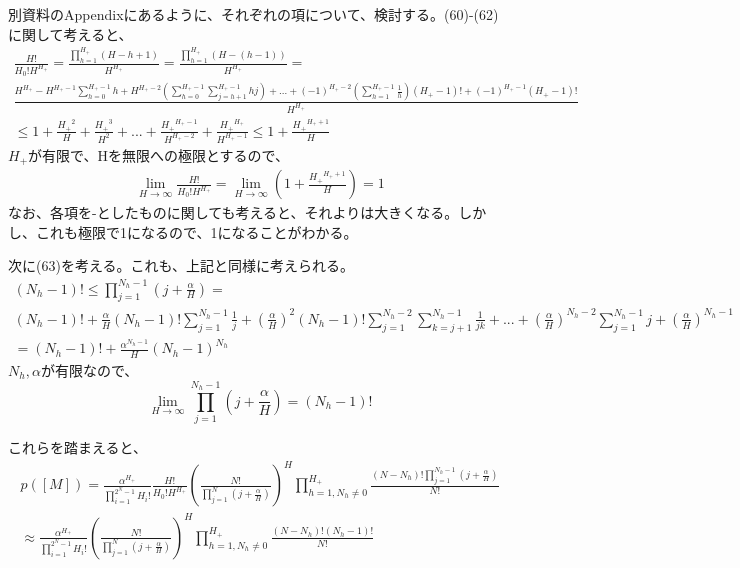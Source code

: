 ﻿\documentclass{jsarticle}
\begin{document}
別資料のAppendixにあるように、それぞれの項について、検討する。(60)-(62)に関して考えると、
\begin{equation}
\begin{split}
\frac{H!}{H_0!H^{H_+}} = \frac{\prod_{h=1}^{H_+}(H - h + 1)}{H^{H_+}} =  \frac{\prod_{h=1}^{H_+}(H - (h - 1))}{H^{H_+}}=\\
\frac{H^{H_+} - H^{H_+ - 1}\sum_{h = 0}^{H_+ - 1} h + H^{H_+ - 2}(\sum_{h = 0}^{H_+ - 1}\sum_{j = h + 1}^{H_+ - 1} hj) + ... + (-1)^{H_+ - 2}(\sum_{h=1}^{H_+ - 1}\frac{1}{h})(H_+ - 1)! + (-1)^{H_+ - 1}(H_+ - 1)!}{H^{H_+}}\\
\leq 1 + \frac{{H_+}^2}{H} + \frac{{H_+}^3}{H^2} + ... + \frac{{H_+}^{H_+ - 1}}{H^{H_+ - 2}} + \frac{{H_+}^{H_+}}{H^{H_+ - 1}} \leq 1 + \frac{{H_+}^{H_+ + 1}}{H}
\end{split}
\end{equation}
$H_+$が有限で、Hを無限への極限とするので、
\begin{equation}
\begin{split}
\lim_{H \rightarrow \infty} \frac{H!}{H_0!H^{H_+}} = \lim_{H \rightarrow \infty}(1 + \frac{{H_+}^{H_+ + 1}}{H}) = 1
\end{split}
\end{equation}
なお、各項を-としたものに関しても考えると、それよりは大きくなる。しかし、これも極限で1になるので、1になることがわかる。

次に(63)を考える。これも、上記と同様に考えられる。
\begin{equation}
\begin{split}
(N_h - 1)! \leq \prod_{j=1}^{N_h - 1}(j + \frac{\alpha}{H}) = \\
(N_h - 1)! + \frac{\alpha}{H}(N_h - 1)!\sum_{j=1}^{N_h - 1}\frac{1}{j} + (\frac{\alpha}{H})^2 (N_h - 1)!\sum_{j=1}^{N_h - 2}\sum_{k=j + 1}^{N_h - 1}\frac{1}{jk} + ... + (\frac{\alpha}{H})^{N_h - 2} \sum_{j=1}^{N_h - 1} j + (\frac{\alpha}{H})^{N_h - 1}\\
= (N_h - 1)! + \frac{\alpha^{N_h - 1}}{H}(N_h - 1)^{N_h}
\end{split}
\end{equation}
$N_h, \alpha$が有限なので、
\begin{equation}
\lim_{H \rightarrow \infty} \prod_{j=1}^{N_h - 1}(j + \frac{\alpha}{H}) = (N_h - 1)!
\end{equation}

これらを踏まえると、
\begin{equation}
\begin{split}
p([M]) = \frac{\alpha^{H_+}}{\prod_{i=1}^{2^N - 1}H_i!} \frac{H!}{H_0!H^{H_+}}(\frac{N!}{\prod_{j = 1}^N (j + \frac{\alpha}{H})})^H \prod_{h=1, N_h \neq 0}^{H_+} \frac{(N - N_h)!\prod_{j=1}^{N_h - 1}(j + \frac{\alpha}{H})}{N!}\\
\approx \frac{\alpha^{H_+}}{\prod_{i=1}^{2^N - 1}H_i!} (\frac{N!}{\prod_{j = 1}^N (j + \frac{\alpha}{H})})^H \prod_{h=1, N_h \neq 0}^{H_+} \frac{(N - N_h)!(N_h - 1)!}{N!}\\
\end{split}
\end{equation}
\end{document}
